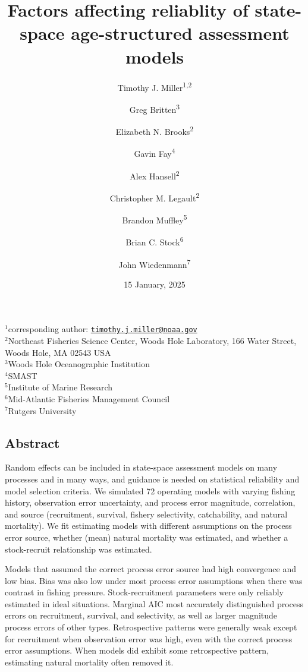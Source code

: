 \documentclass[
  12pt,
]{article}
\title{Factors affecting reliablity of state-space age-structured
assessment models}
\author{Timothy J. Miller\textsuperscript{1,2} \and Greg
Britten\textsuperscript{3} \and Elizabeth N.
Brooks\textsuperscript{2} \and Gavin Fay\textsuperscript{4} \and Alex
Hansell\textsuperscript{2} \and Christopher M.
Legault\textsuperscript{2} \and Brandon
Muffley\textsuperscript{5} \and Brian C.
Stock\textsuperscript{6} \and John Wiedenmann\textsuperscript{7}}
\date{15 January, 2025}
\begin{document}
\maketitle

\(^1\)corresponding author:
\href{mailto:timothy.j.miller@noaa.gov}{\nolinkurl{timothy.j.miller@noaa.gov}}\\
\(^2\)Northeast Fisheries Science Center, Woods Hole Laboratory, 166
Water Street, Woods Hole, MA 02543 USA\\
\(^3\)Woods Hole Oceanographic Institution\\
\(^4\)SMAST\\
\(^5\)Institute of Marine Research\\
\(^6\)Mid-Atlantic Fisheries Management Council\\
\(^7\)Rutgers University\\

\pagebreak

\hypertarget{abstract}{%
\subsection*{Abstract}\label{abstract}}

Random effects can be included in state-space assessment models on many
processes and in many ways, and guidance is needed on statistical
reliability and model selection criteria. We simulated 72 operating
models with varying fishing history, observation error uncertainty, and
process error magnitude, correlation, and source (recruitment, survival,
fishery selectivity, catchability, and natural mortality). We fit
estimating models with different assumptions on the process error
source, whether (mean) natural mortality was estimated, and whether a
stock-recruit relationship was estimated.

Models that assumed the correct process error source had high
convergence and low bias. Bias was also low under most process error
assumptions when there was contrast in fishing pressure.
Stock-recruitment parameters were only reliably estimated in ideal
situations. Marginal AIC most accurately distinguished process errors on
recruitment, survival, and selectivity, as well as larger magnitude
process errors of other types. Retrospective patterns were generally
weak except for recruitment when observation error was high, even with
the correct process error assumptions. When models did exhibit some
retrospective pattern, estimating natural mortality often removed it.
\end{document}
